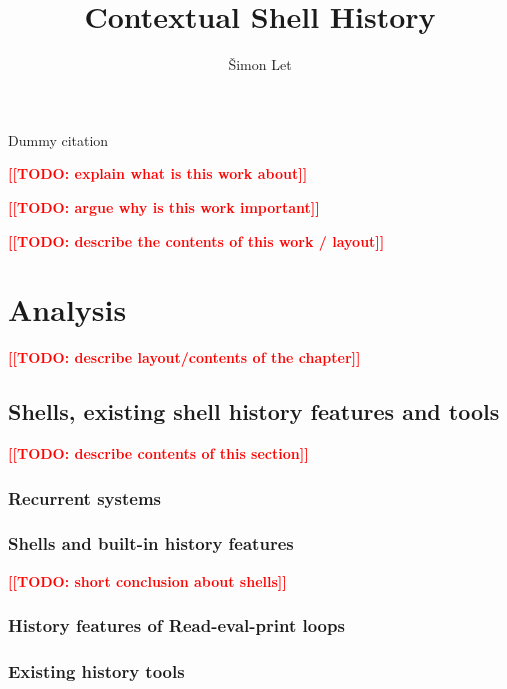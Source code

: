 \documentclass[thesis=M,english]{FITthesis}[2012/10/20]
\title{Contextual Shell History}
\author{Šimon Let} %
\newcommand{\todotext}[1]{\textcolor{red}{\textbf{[[#1]]}}}
\newcommand{\blind}[1][1]{\textcolor{mygray}{\Blindtext[#1][1]}}
\begin{document}
\begin{introduction}

Dummy citation \cite{greenberg1993computer}

\todotext{TODO: explain what is this work about}

\todotext{TODO: argue why is this work important}

\blind[0]

\todotext{TODO: describe the contents of this work / layout}

\blind[2]

\end{introduction}


\chapter{Analysis}

\todotext{TODO: describe layout/contents of the chapter}

\blind

\section{Shells, existing shell history features and tools}

\todotext{TODO: describe contents of this section}

\blind

\subsection{Recurrent systems}

\blind

\subsection{Shells and built-in history features}


\blind[4]

\todotext{TODO: short conclusion about shells}

\subsection{History features of Read-eval-print loops}

\blind[1]

\subsection{Existing history tools}
\end{document}
